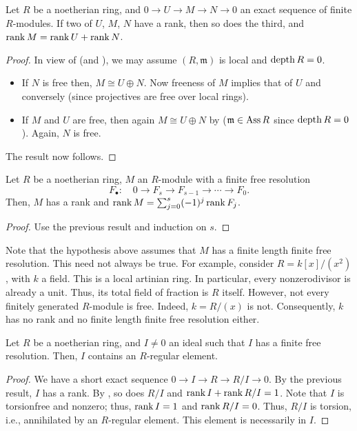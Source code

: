 \documentclass[12pt]{article}
\begin{document}
\begin{prop} \label{prop:rank-two-out-of-three}
	Let $R$ be a noetherian ring, and $0 \to U \to M \to N \to 0$ an exact sequence of finite $R$-modules. If two of $U$, $M$, $N$ have a rank, then so does the third, and $\operatorname{rank} M = \operatorname{rank} U + \operatorname{rank} N$.
\end{prop}
\begin{proof} 
	In view of  (and ), we may assume $(R, \mathfrak{m})$ is local and $\operatorname{depth} R = 0$. 
	\begin{itemize}
		\item If $N$ is free then, $M \cong U \oplus N$. Now freeness of $M$ implies that of $U$ and conversely (since projectives are free over local rings).
		\item If $M$ and $U$ are free, then again $M \cong U \oplus N$ by  ($\mathfrak{m} \in \operatorname{Ass} R$ since $\operatorname{depth} R = 0$). Again, $N$ is free.
	\end{itemize}
	The result now follows.
\end{proof}

\begin{cor}
	Let $R$ be a noetherian ring, $M$ an $R$-module with a finite free resolution 
	\begin{equation*} 
		F_{\bullet}: \quad 0 \to F_{s} \to F_{s - 1} \to \cdots \to F_{0}.
	\end{equation*}
	Then, $M$ has a rank and $\operatorname{rank} M = \sum_{j = 0}^{s} (-1)^{j} \operatorname{rank} F_{j}$.
\end{cor}
\begin{proof}
	Use the previous result and induction on $s$.
\end{proof}
Note that the hypothesis above assumes that $M$ has a finite length finite free resolution. This need not always be true. For example, consider $R = k[x]/(x^{2})$, with $k$ a field. This is a local artinian ring. In particular, every nonzerodivisor is already a unit. Thus, its total field of fraction is $R$ itself. However, not every finitely generated $R$-module is free. Indeed, $k = R/(x)$ is not. Consequently, $k$ has no rank and no finite length finite free resolution either.

\begin{cor}
	Let $R$ be a noetherian ring, and $I \neq 0$ an ideal such that $I$ has a finite free resolution. Then, $I$ contains an $R$-regular element.
\end{cor}
\begin{proof} 
	We have a short exact sequence $0 \to I \to R \to R/I \to 0$. By the previous result, $I$ has a rank. By , so does $R/I$ and $\operatorname{rank} I + \operatorname{rank} R/I = 1$. Note that $I$ is torsionfree and nonzero; thus, $\operatorname{rank} I = 1$ and $\operatorname{rank} R/I = 0$. Thus, $R/I$ is torsion, i.e., annihilated by an $R$-regular element. This element is necessarily in $I$.
\end{proof}
\end{document}
